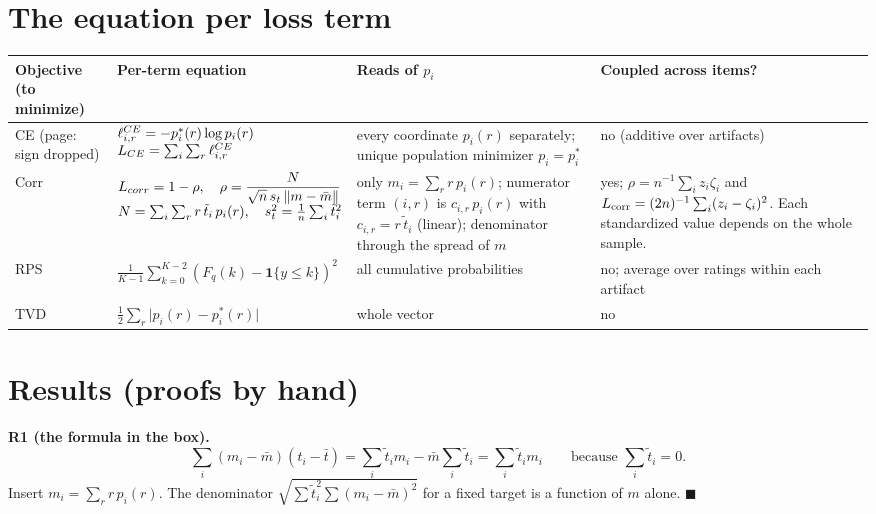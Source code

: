 \documentclass[11pt]{article}
\newcommand{\ttil}{\tilde t}
\begin{document}
\section{The equation per loss term}
{\small\renewcommand{\arraystretch}{1.15}
\begin{tabularx}{\textwidth}{@{}>{\raggedright\arraybackslash}p{1.75cm}>{\raggedright\arraybackslash}p{5.68cm}>{\raggedright\arraybackslash}X>{\raggedright\arraybackslash}X@{}}
\toprule
\textbf{Objective (to minimize)} & \textbf{Per-term equation} & \textbf{Reads of $p_i$} & \textbf{Coupled across items?}\\
\midrule
CE (page: sign dropped) &
$\begin{array}{@{}l@{}}\ell^{CE}_{i,r}=-p^\ast_i(r)\log p_i(r)\\ L_{CE}=\sum_i\sum_r\ell^{CE}_{i,r}\end{array}$ &
every coordinate $p_i(r)$ separately; unique population minimizer $p_i=p^\ast_i$ & no (additive over artifacts)\\
Corr &
$\begin{array}{@{}l@{}}L_{corr}=1-\rho,\quad \rho=\dfrac{N}{\sqrt{n}\,s_t\,\lVert m-\bar m\rVert}\\ N=\sum_i\sum_r r\,\ttil_i\,p_i(r),\quad s_t^2=\tfrac1n\sum_i\ttil_i^2\end{array}$ &
only $m_i=\sum_r r\,p_i(r)$; numerator term $(i,r)$ is $c_{i,r}\,p_i(r)$ with $c_{i,r}=r\,\ttil_i$ (linear); denominator through the spread of $m$ &
yes; $\rho=n^{-1}\sum_i z_i\zeta_i$ and $L_{\rm corr}=(2n)^{-1}\sum_i(z_i-\zeta_i)^2$. Each standardized value depends on the whole sample.\\
RPS &
$\displaystyle\frac1{K-1}\sum_{k=0}^{K-2}(F_q(k)-\mathbf{1}\{y\le k\})^2$ & all cumulative probabilities & no; average over ratings within each artifact\\
TVD &
$\displaystyle\tfrac12\sum_r\lvert p_i(r)-p^\ast_i(r)\rvert$ & whole vector & no\\
\bottomrule
\end{tabularx}}

\section{Results (proofs by hand)}
\textbf{R1 (the formula in the box).}
\[
\sum_i(m_i-\bar m)(t_i-\bar t)=\sum_i\ttil_i m_i-\bar m\sum_i\ttil_i=\sum_i\ttil_i m_i
\qquad\text{because }\sum_i\ttil_i=0 .
\]
Insert $m_i=\sum_r r\,p_i(r)$. The denominator $\sqrt{\sum\ttil_i^2\sum(m_i-\bar m)^2}$ for a fixed target is a function of $m$ alone. \hfill$\blacksquare$
\end{document}
